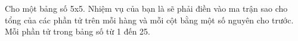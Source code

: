 Cho một bảng số 5x5. Nhiệm vụ của bạn là sẽ phải điền vào ma trận sao cho tổng của các phần tử trên mỗi hàng và mỗi cột bằng một số nguyên cho trước. Mỗi phần tử trong bảng số từ 1 đến 25.